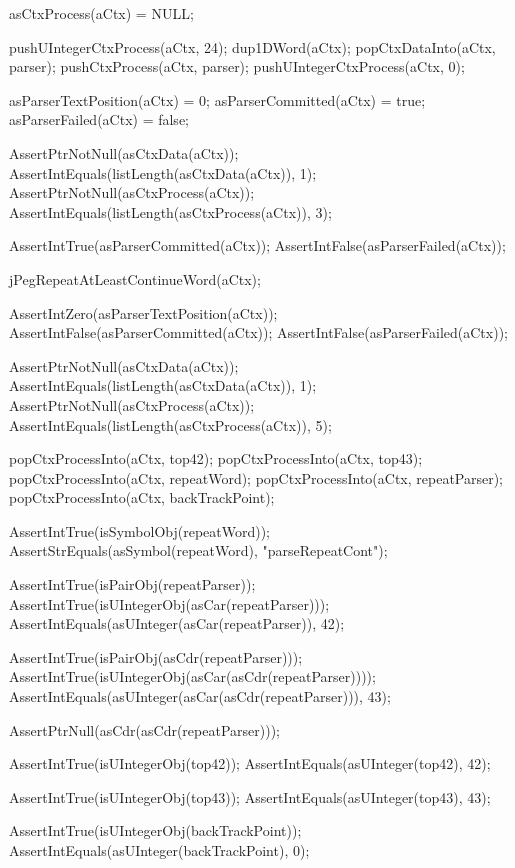 \startCTest
  asCtxProcess(aCtx) = NULL;
  
  pushUIntegerCtxProcess(aCtx, 24);
  dup1DWord(aCtx);
  popCtxDataInto(aCtx, parser);
  pushCtxProcess(aCtx, parser);
  pushUIntegerCtxProcess(aCtx, 0);
  
  asParserTextPosition(aCtx) = 0;
  asParserCommitted(aCtx)    = true;
  asParserFailed(aCtx)       = false;
  
  AssertPtrNotNull(asCtxData(aCtx));
  AssertIntEquals(listLength(asCtxData(aCtx)), 1);
  AssertPtrNotNull(asCtxProcess(aCtx));
  AssertIntEquals(listLength(asCtxProcess(aCtx)), 3);
  
  AssertIntTrue(asParserCommitted(aCtx));
  AssertIntFalse(asParserFailed(aCtx));
  
  jPegRepeatAtLeastContinueWord(aCtx);
  
  AssertIntZero(asParserTextPosition(aCtx));
  AssertIntFalse(asParserCommitted(aCtx));
  AssertIntFalse(asParserFailed(aCtx));
  
  AssertPtrNotNull(asCtxData(aCtx));
  AssertIntEquals(listLength(asCtxData(aCtx)), 1);
  AssertPtrNotNull(asCtxProcess(aCtx));
  AssertIntEquals(listLength(asCtxProcess(aCtx)), 5);
    
  popCtxProcessInto(aCtx, top42);
  popCtxProcessInto(aCtx, top43);
  popCtxProcessInto(aCtx, repeatWord);
  popCtxProcessInto(aCtx, repeatParser);
  popCtxProcessInto(aCtx, backTrackPoint);
  
  AssertIntTrue(isSymbolObj(repeatWord));
  AssertStrEquals(asSymbol(repeatWord), "parseRepeatCont");
  
  AssertIntTrue(isPairObj(repeatParser));
  AssertIntTrue(isUIntegerObj(asCar(repeatParser)));
  AssertIntEquals(asUInteger(asCar(repeatParser)), 42);
  
  AssertIntTrue(isPairObj(asCdr(repeatParser)));
  AssertIntTrue(isUIntegerObj(asCar(asCdr(repeatParser))));
  AssertIntEquals(asUInteger(asCar(asCdr(repeatParser))), 43);
  
  AssertPtrNull(asCdr(asCdr(repeatParser)));
  
  AssertIntTrue(isUIntegerObj(top42));
  AssertIntEquals(asUInteger(top42), 42);  

  AssertIntTrue(isUIntegerObj(top43));
  AssertIntEquals(asUInteger(top43), 43);
  
  AssertIntTrue(isUIntegerObj(backTrackPoint));
  AssertIntEquals(asUInteger(backTrackPoint), 0);
\stopCTest
\stopTestCase

